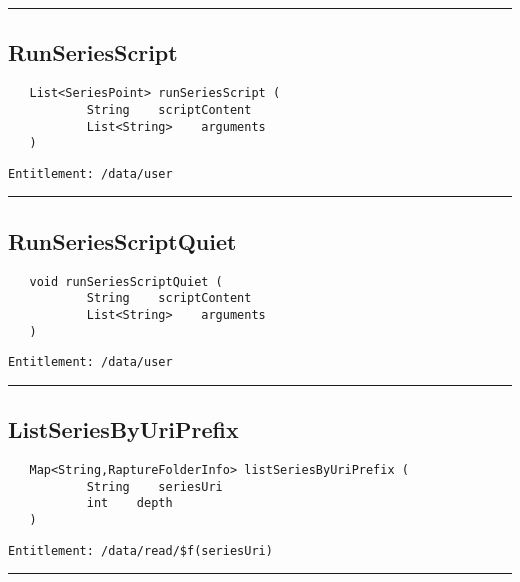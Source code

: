 \rule{12cm}{2pt}
\subsection{RunSeriesScript}
\label{Api:RunSeriesScript}
\begin{Verbatim}
   List<SeriesPoint> runSeriesScript (
           String    scriptContent
           List<String>    arguments
   )
\end{Verbatim}
\begin{Verbatim}[formatcom=\color{Maroon}]
  Entitlement: /data/user
\end{Verbatim}



\rule{12cm}{2pt}
\subsection{RunSeriesScriptQuiet}
\label{Api:RunSeriesScriptQuiet}
\begin{Verbatim}
   void runSeriesScriptQuiet (
           String    scriptContent
           List<String>    arguments
   )
\end{Verbatim}
\begin{Verbatim}[formatcom=\color{Maroon}]
  Entitlement: /data/user
\end{Verbatim}



\rule{12cm}{2pt}
\subsection{ListSeriesByUriPrefix}
\label{Api:ListSeriesByUriPrefix}
\begin{Verbatim}
   Map<String,RaptureFolderInfo> listSeriesByUriPrefix (
           String    seriesUri
           int    depth
   )
\end{Verbatim}
\begin{Verbatim}[formatcom=\color{Maroon}]
  Entitlement: /data/read/$f(seriesUri)
\end{Verbatim}



\rule{12cm}{2pt}
